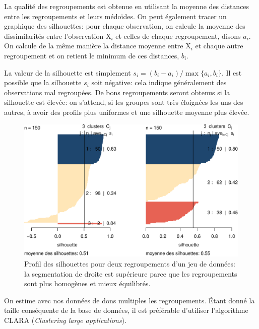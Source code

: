 \documentclass[
  11pt,
  letterpaper,
]{scrbook}
\theoremstyle{definition}
\theoremstyle{remark}
\begin{document}
La qualité des regroupements est obtenue en utilisant la moyenne des
distances entre les regroupements et leurs médoïdes. On peut également
tracer un graphique des silhouettes: pour chaque observation, on calcule
la moyenne des dissimilarités entre l'observation \(\mathrm{X}_i\) et
celles de chaque regroupement, disons \(a_i\). On calcule de la même
manière la distance moyenne entre \(\mathrm{X}_i\) et chaque autre
regroupement et on retient le minimum de ces distances, \(b_i\).

La valeur de la silhouette est simplement
\(s_i=(b_i-a_i)/\max\{a_i, b_i\}\). Il est possible que la silhouette
\(s_i\) soit négative: cela indique généralement des observations mal
regroupées. De bons regroupements seront obtenus si la silhouette est
élevée: on s'attend, si les groupes sont très éloignées les uns des
autres, à avoir des profils plus uniformes et une silhouette moyenne
plus élevée.

\begin{figure}[ht!]

{\centering \includegraphics[width=1\textwidth,height=\textheight]{./03-regroupements_files/figure-pdf/fig-silhouette-1.pdf}

}

\caption{\label{fig-silhouette}Profil des silhouettes pour deux
regroupements d'un jeu de données: la segmentation de droite est
supérieure parce que les regroupements sont plus homogènes et mieux
équilibrés.}

\end{figure}

On estime avec nos données de dons multiples les regroupements. Étant
donné la taille conséquente de la base de données, il est préférable
d'utiliser l'algorithme CLARA (\emph{Clustering large applications}).
\end{document}
